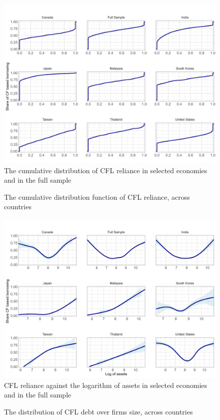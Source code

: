 \documentclass[12pt]{article}
\begin{document}
\begin{figure}[H]  %
    \centering
    \caption{The cumulative distribution function of CFL reliance, across countries} \label{chart:orb1}
    \includegraphics[width=1\textwidth]{cdf_country.png}
    \small The cumulative distribution of CFL reliance in selected economies and in the full sample
\end{figure}

\begin{figure}[H]  %
    \centering
    \caption{The distribution of CFL debt over firms size, across countries} \label{chart:orb2}
    \includegraphics[width=1\textwidth]{smoothy_country.png}
    \small CFL reliance against the logarithm of assets in selected economies and in the full sample
\end{figure}
\end{document}
